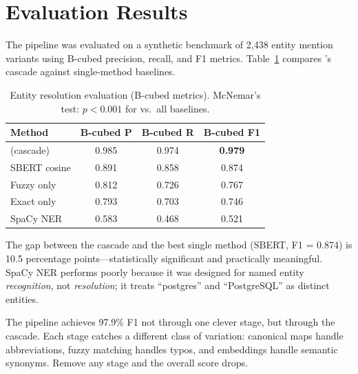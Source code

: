 \section{Evaluation Results}
\label{sec:er-evaluation}

The pipeline was evaluated on a synthetic benchmark of 2,438 entity
mention variants using B-cubed precision, recall, and F1 metrics.
Table~\ref{tab:er-evaluation} compares \sysname{}'s cascade against
single-method baselines.

\begin{table}[ht]
\centering
\caption{Entity resolution evaluation (B-cubed metrics).  McNemar's test:
$p < 0.001$ for \sysname{} vs.\ all baselines.}
\label{tab:er-evaluation}
\begin{tabular}{lccc}
\toprule
\textbf{Method} & \textbf{B-cubed P} & \textbf{B-cubed R} & \textbf{B-cubed F1} \\
\midrule
\sysname{} (cascade) & 0.985 & 0.974 & \textbf{0.979} \\
SBERT cosine          & 0.891 & 0.858 & 0.874 \\
Fuzzy only            & 0.812 & 0.726 & 0.767 \\
Exact only            & 0.793 & 0.703 & 0.746 \\
SpaCy NER             & 0.583 & 0.468 & 0.521 \\
\bottomrule
\end{tabular}
\end{table}

The gap between the cascade and the best single method (SBERT, F1 = 0.874)
is 10.5 percentage points---statistically significant and practically
meaningful.  SpaCy NER performs poorly because it was designed for named
entity \emph{recognition}, not \emph{resolution}; it treats ``postgres'' and
``PostgreSQL'' as distinct entities.

\begin{keyinsight}
The pipeline achieves 97.9\% F1 not through one clever stage, but through the
cascade.  Each stage catches a different class of variation: canonical maps
handle abbreviations, fuzzy matching handles typos, and embeddings handle
semantic synonyms.  Remove any stage and the overall score drops.
\end{keyinsight}
